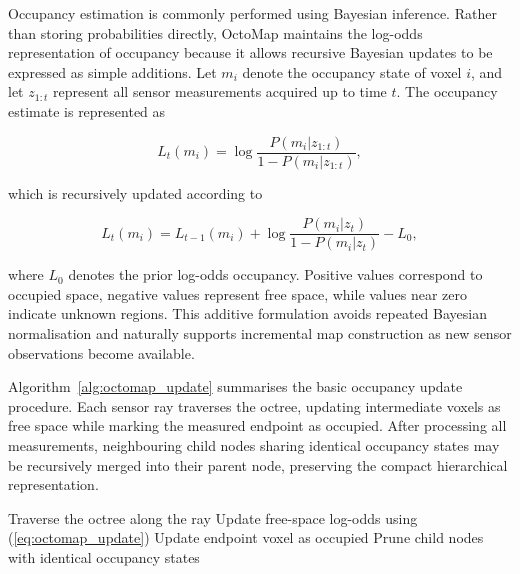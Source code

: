\documentclass{ieeeaccess}
\begin{document}
Occupancy estimation is commonly performed using Bayesian inference. Rather than storing probabilities directly, OctoMap maintains the log-odds representation of occupancy because it allows recursive Bayesian updates to be expressed as simple additions. Let $m_i$ denote the occupancy state of voxel $i$, and let $z_{1:t}$ represent all sensor measurements acquired up to time $t$. The occupancy estimate is represented as

\begin{equation}
L_t(m_i)
=
\log
\frac{P(m_i|z_{1:t})}
     {1-P(m_i|z_{1:t})},
\label{eq:octomap_logodds}
\end{equation}

which is recursively updated according to

\begin{equation}
L_t(m_i)
=
L_{t-1}(m_i)
+
\log
\frac{P(m_i|z_t)}
     {1-P(m_i|z_t)}
-
L_0,
\label{eq:octomap_update}
\end{equation}

where $L_0$ denotes the prior log-odds occupancy. Positive values correspond to occupied space, negative values represent free space, while values near zero indicate unknown regions. This additive formulation avoids repeated Bayesian normalisation and naturally supports incremental map construction as new sensor observations become available.

Algorithm~\ref{alg:octomap_update} summarises the basic occupancy update procedure. Each sensor ray traverses the octree, updating intermediate voxels as free space while marking the measured endpoint as occupied. After processing all measurements, neighbouring child nodes sharing identical occupancy states may be recursively merged into their parent node, preserving the compact hierarchical representation.

\begin{algorithm}[t]
\caption{Incremental Probabilistic OctoMap Update}
\label{alg:octomap_update}
\begin{algorithmic}[1]
    \State Traverse the octree along the ray
        \State Update free-space log-odds using (\ref{eq:octomap_update})
    \EndFor
    \State Update endpoint voxel as occupied
\EndFor
\State Prune child nodes with identical occupancy states
\end{algorithmic}
\end{algorithm}
\end{document}
